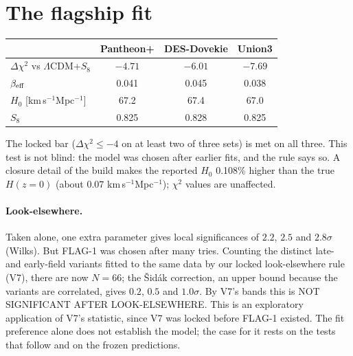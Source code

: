 \documentclass[11pt]{article}
\begin{document}
\section{The flagship fit}
\begin{center}
\begin{tabular}{lccc}
\toprule
 & Pantheon+ & DES-Dovekie & Union3\\
\midrule
$\Delta\chi^2$ vs $\Lambda$CDM+$S_8$ & $-4.71$ & $-6.01$ & $-7.69$\\
$\beta_{\rm eff}$ & 0.041 & 0.045 & 0.038\\
$H_0$ [km\,s$^{-1}$Mpc$^{-1}$] & 67.2 & 67.4 & 67.0\\
$S_8$ & 0.825 & 0.828 & 0.825\\
\bottomrule
\end{tabular}
\end{center}
The locked bar ($\Delta\chi^2\le-4$ on at least two of three sets) is met on all three. This test is not blind: the
model was chosen after earlier fits, and the rule says so. A closure detail of the build makes the reported $H_0$
0.108\% higher than the true $H(z{=}0)$ (about $0.07$ km\,s$^{-1}$Mpc$^{-1}$); $\chi^2$ values are unaffected.

\paragraph{Look-elsewhere.} Taken alone, one extra parameter gives local significances of $2.2$, $2.5$ and $2.8\sigma$
(Wilks). But FLAG-1 was chosen after many tries. Counting the distinct late- and early-field variants fitted to the
same data by our locked look-elsewhere rule (V7), there are now $N=66$; the \v{S}id\'ak correction, an upper bound because
the variants are correlated, gives $0.2$, $0.5$ and $1.0\sigma$. By V7's bands this is NOT SIGNIFICANT AFTER LOOK-ELSEWHERE.
This is an exploratory application of V7's statistic, since V7 was locked before FLAG-1 existed. The fit preference
alone does not establish the model; the case for it rests on the tests that follow and on the frozen predictions.
\end{document}
